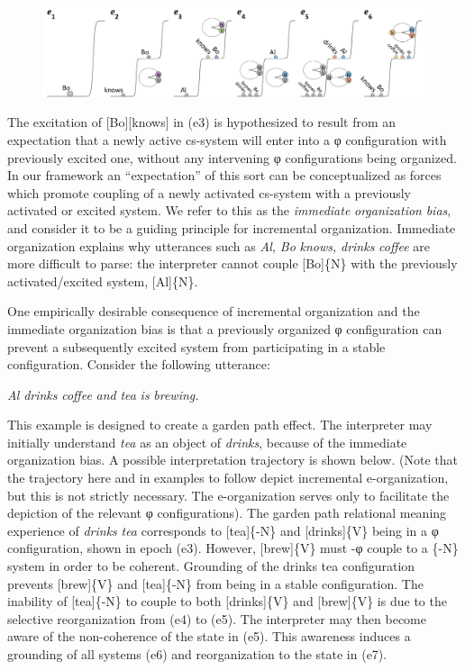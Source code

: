   
\begin{figure}
\includegraphics[width=\textwidth]{figures/Tilsen-img129.png}
\caption{\missingcaption}
\label{fig:}
\end{figure}
 

  The excitation of [Bo][knows] in (e3) is hypothesized to result from an expectation that a newly active cs-system will enter into a φ configuration with previously excited one, without any intervening φ configurations being organized. In our framework an “expectation” of this sort can be conceptualized as forces which promote coupling of a newly activated cs-system with a previously activated or excited system. We refer to this as the \textit{immediate} \textit{organization} \textit{bias}, and consider it to be a guiding principle for incremental organization. Immediate organization explains why utterances such as \textit{Al,} \textit{Bo} \textit{knows,} \textit{drinks} \textit{coffee} are more difficult to parse: the interpreter cannot couple [Bo]\{N\} with the previously activated/excited system, [Al]\{N\}.

  One empirically desirable consequence of incremental organization and the immediate organization bias is that a previously organized φ configuration can prevent a subsequently excited system from participating in a stable configuration. Consider the following utterance: 

    \textit{Al} \textit{drinks} \textit{coffee} \textit{and} \textit{tea} \textit{is} \textit{brewing.}   

  This example is designed to create a garden path effect. The interpreter may initially understand \textit{tea} as an object of \textit{drinks}, because of the immediate organization bias. A possible interpretation trajectory is shown below. (Note that the trajectory here and in examples to follow depict incremental e-organization, but this is not strictly necessary. The e-organization serves only to facilitate the depiction of the relevant φ configurations). The garden path relational meaning experience of \textit{drinks} \textit{tea} corresponds to [tea]\{-N\} and [drinks]\{V\} being in a φ configuration, shown in epoch (e3).  However, [brew]\{V\} must -φ couple to a \{-N\} system in order to be coherent. Grounding of the {\textbar}drinks tea{\textbar} configuration prevents [brew]\{V\} and [tea]\{-N\} from being in a stable configuration. The inability of [tea]\{-N\} to couple to both [drinks]\{V\} and [brew]\{V\} is due to the selective reorganization from (e4) to (e5). The interpreter may then become aware of the non-coherence of the state in (e5). This awareness induces a grounding of all systems (e6) and reorganization to the state in (e7). 

